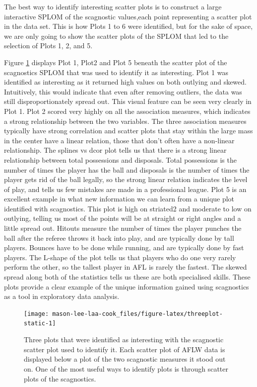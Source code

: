 The best way to identify interesting scatter plots is to construct a large interactive SPLOM of the scagnostic values,each point representing a scatter plot in the data set. This is how Plots 1 to 6 were identified, but for the sake of space, we are only going to show the scatter plots of the SPLOM that led to the selection of Plots 1, 2, and 5.

Figure \ref{fig:threeplot-static} displays Plot 1, Plot2 and Plot 5 beneath the scatter plot of the scagnostics SPLOM that was used to identify it as interesting. Plot 1 was identified as interesting as it returned high values on both outlying and skewed. Intuitively, this would indicate that even after removing outliers, the data was still disproportionately spread out. This visual feature can be seen very clearly in Plot 1. Plot 2 scored very highly on all the association measures, which indicates a strong relationship between the two variables. The three association measures typically have strong correlation and scatter plots that stay within the large mass in the center have a linear relation, those that don't often have a non-linear relationship. The splines vs dcor plot tells us that there is a strong linear relationship between total possessions and disposals. Total possessions is the number of times the player has the ball and disposals is the number of times the player gets rid of the ball legally, so the strong linear relation indicates the level of play, and tells us few mistakes are made in a professional league. Plot 5 is an excellent example in what new information we can learn from a unique plot identified with scagnostics. This plot is high on striated2 and moderate to low on outlying, telling us most of the points will be at straight or right angles and a little spread out. Hitouts measure the number of times the player punches the ball after the referee throws it back into play, and are typically done by tall players. Bounces have to be done while running, and are typically done by fast players. The L-shape of the plot tells us that players who do one very rarely perform the other, so the tallest player in AFL is rarely the fastest. The skewed spread along both of the statistics tells us these are both specialised skills. These plots provide a clear example of the unique information gained using scagnostics as a tool in exploratory data analysis.

\begin{figure}

{\centering \texttt{[image: mason-lee-laa-cook\_files/figure-latex/threeplot-static-1]} 

}

\caption{Three plots that were identified as interesting with the scagnostic scatter plot used to identify it. Each scatter plot of AFLW data is displayed below a plot of the two scagnostic measures it stood out on. One of the most useful ways to identify plots is through scatter plots of the scagnostics.}\label{fig:threeplot-static}
\end{figure}

